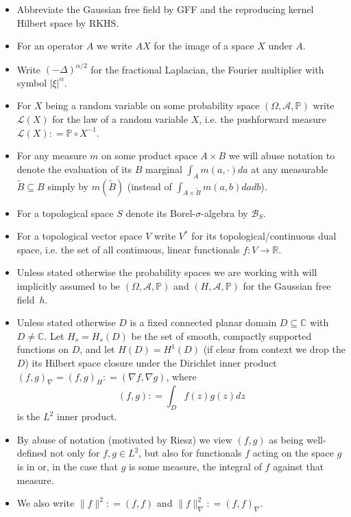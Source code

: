\documentclass[11pt,reqno]{amsart}
\numberwithin{equation}{section}
\newcommand{\deq}{\mathrel{\mathop:}=}
\begin{document}
\begin{itemize}
	\item Abbreviate the Gaussian free field by GFF and the reproducing kernel Hilbert space by RKHS.
	\item For an operator $A$ we write $AX$ for the image of a space $X$ under $A$.
	\item Write $(-\Delta)^{\alpha/2}$ for the fractional Laplacian, the Fourier multiplier with symbol $|\xi|^\alpha$.
	\item For $X$ being a random variable on some probability space $(\Omega, \mathcal A, \mathbb P)$ write $\mathcal L(X)$ for the law of a random variable $X$, i.e. the pushforward measure $\mathcal L(X)\deq \mathbb P\circ X^{-1}$.
	\item For any measure $m$ on some product space $A\times B$ we will abuse notation to denote the evaluation of its $B$ marginal $\int_A m(a,\cdot)da$ at any measurable $\tilde B\subseteq B$ simply by $m(\tilde B)$ (instead of $\int_{A\times\tilde B}m(a,b)dadb$).
	\item For a topological space $S$ denote its Borel-$\sigma$-algebra by $\mathcal B_S$.
	\item For a topological vector space $V$ write $V^*$ for its topological/continuous dual space, i.e. the set of all continuous, linear functionals $f:V\rightarrow\mathbb R$.
	\item Unless stated otherwise the probability spaces we are working with will implicitly assumed to be $(\Omega,\mathcal A,\mathbb P)$ and $(H,\mathcal A, \mathbb P)$ for the Gaussian free field~$h$.
	\item Unless stated otherwise $D$ is a fixed connected planar domain $D\subseteq\mathbb C$ with $D\neq\mathbb C$. Let $H_s=H_s(D)$ be the set of smooth, compactly supported functions on $D$, and let $H(D)=H^1(D)$ (if clear from context we drop the $D$) its Hilbert space closure under the Dirichlet inner product $(f,g)_\nabla=(f,g)_H\deq (\nabla f,\nabla g)$, where $$(f,g)\deq\int_D f(z)g(z)dz$$ is the $L^2$ inner product.
	\item By abuse of notation (motivated by Riesz) we view $(f,g)$ as being well-defined not only for $f,g\in L^2$, but also for functionals $f$ acting on the space $g$ is in or, in the case that $g$ is some measure, the integral of $f$ against that measure.
	\item We also write $\|f\|^2\deq (f,f)$ and $\|f\|^2_\nabla\deq (f,f)_\nabla$.

\end{itemize}
\end{document}
